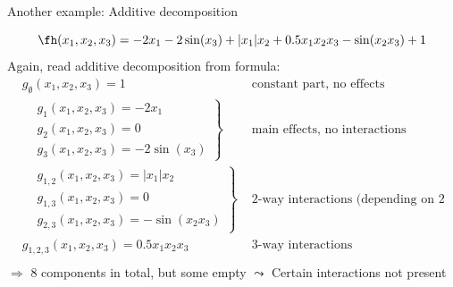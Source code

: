 \documentclass[10pt,compress,t,notes=noshow, xcolor=table]{beamer}
\begin{document}
\begin{framev}[align=top]{Another example: Additive decomposition}
\begin{example}
$$
\fh(x_1, x_2, x_3) = - 2x_1 - 2\sin(x_3) + |x_1|x_2 + 0.5 x_1 x_2 x_3 - \sin(x_2 x_3) + 1
$$
Again, read additive decomposition from formula:
\pause
\begin{equation}\label{eq:func_decomp_second_min_example}
\begin{aligned}
& g_\emptyset(x_1, x_2, x_3) = 1 & \text{ constant part, no effects}  \\
&
\left.\begin{aligned}
& g_1(x_1, x_2, x_3) = - 2x_1 \\
& g_2(x_1, x_2, x_3) = 0 \\
& g_3(x_1, x_2, x_3) = - 2\sin(x_3)
\end{aligned}\right\}
& \text{ main effects, no interactions}  \\
&
\left.\begin{aligned}
& g_{1,2}(x_1, x_2, x_3) = |x_1|x_2 \\
& g_{1,3}(x_1, x_2, x_3) = 0 \\
& g_{2,3}(x_1, x_2, x_3) = - \sin(x_2 x_3)
\end{aligned}\right\}
& \text{ 2-way interactions (depending on 2 features)}  \\
& g_{1,2,3}(x_1, x_2, x_3) = 0.5 x_1 x_2 x_3 & \text{ 3-way interactions}  \\
\end{aligned}
\end{equation}
\(\Rightarrow\) 8 components in total, but some empty $\leadsto$ Certain interactions not present
\end{example}
\end{framev}
\end{document}

